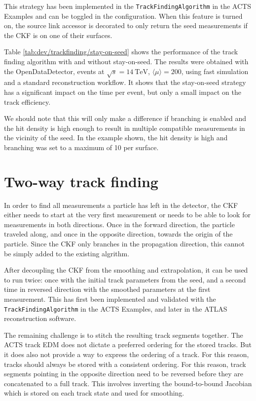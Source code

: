 This strategy has been implemented in the \texttt{TrackFindingAlgorithm} in the ACTS Examples and can be toggled in the configuration. When this feature is turned on, the source link accessor is decorated to only return the seed measurements if the CKF is on one of their surfaces.



Table \ref{tab:dev/trackfinding/stay-on-seed} shows the performance of the track finding algorithm with and without stay-on-seed. The results were obtained with the OpenDataDetector, \ttbar events at $\sqrt{s} = 14 \ \text{TeV}$, $\langle \mu \rangle = 200$, using fast simulation and a standard reconstruction workflow. It shows that the stay-on-seed strategy has a significant impact on the time per event, but only a small impact on the track efficiency.

We should note that this will only make a difference if branching is enabled and the hit density is high enough to result in multiple compatible measurements in the vicinity of the seed. In the example shown, the hit density is high and branching was set to a maximum of 10 per surface.

\section{Two-way track finding}
\label{sec:dev/trackfinding/two-way}

In order to find all measurements a particle has left in the detector, the CKF either needs to start at the very first measurement or needs to be able to look for measurements in both directions. Once in the forward direction, the particle traveled along, and once in the opposite direction, towards the origin of the particle. Since the CKF only branches in the propagation direction, this cannot be simply added to the existing algrithm.

After decoupling the CKF from the smoothing and extrapolation, it can be used to run twice: once with the initial track parameters from the seed, and a second time in reversed direction with the smoothed parameters at the first measurement. This has first been implemented and validated with the \texttt{TrackFindingAlgorithm} in the ACTS Examples, and later in the ATLAS reconstruction software.

The remaining challenge is to stitch the resulting track segments together. The ACTS track EDM does not dictate a preferred ordering for the stored tracks. But it does also not provide a way to express the ordering of a track. For this reason, tracks should always be stored with a consistent ordering. For this reason, track segments pointing in the opposite direction need to be reversed before they are concatenated to a full track. This involves inverting the bound-to-bound Jacobian which is stored on each track state and used for smoothing.

